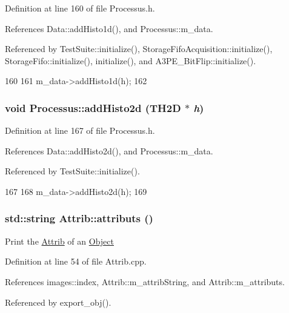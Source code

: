 Definition at line 160 of file Processus.h.

References Data::addHisto1d(), and Processus::m\_\-data.

Referenced by TestSuite::initialize(), StorageFifoAcquisition::initialize(), StorageFifo::initialize(), initialize(), and A3PE\_\-BitFlip::initialize().


\begin{DoxyCode}
160                            {
161     m_data->addHisto1d(h);
162   }
\end{DoxyCode}
\hypertarget{classProcessus_ac1ed1aed5edaeabdf18aa56775440471}{
\subsubsection[{addHisto2d}]{\setlength{\rightskip}{0pt plus 5cm}void Processus::addHisto2d (TH2D $\ast$ {\em h})}}
\label{classProcessus_ac1ed1aed5edaeabdf18aa56775440471}


Definition at line 167 of file Processus.h.

References Data::addHisto2d(), and Processus::m\_\-data.

Referenced by TestSuite::initialize().


\begin{DoxyCode}
167                            {
168     m_data->addHisto2d(h);
169   }
\end{DoxyCode}
\hypertarget{classAttrib_aee7bbf16b144887f196e1341b24f8a26}{
\subsubsection[{attributs}]{\setlength{\rightskip}{0pt plus 5cm}std::string Attrib::attributs ()}}
\label{classAttrib_aee7bbf16b144887f196e1341b24f8a26}
Print the \hyperlink{classAttrib}{Attrib} of an \hyperlink{classObject}{Object} 

Definition at line 54 of file Attrib.cpp.

References images::index, Attrib::m\_\-attribString, and Attrib::m\_\-attributs.

Referenced by export\_\-obj().


